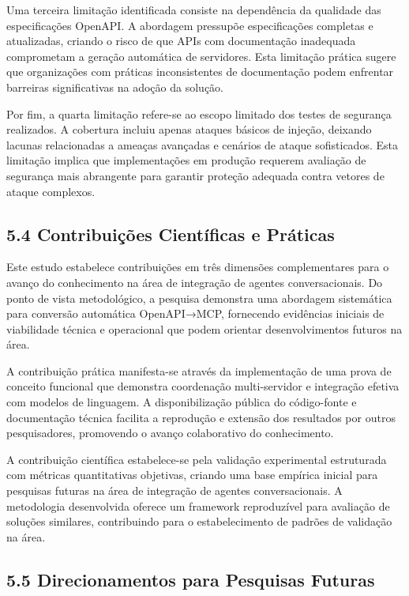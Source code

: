 \documentclass[
]{article}
\begin{document}
Uma terceira limitação identificada consiste na dependência da qualidade
das especificações OpenAPI. A abordagem pressupõe especificações
completas e atualizadas, criando o risco de que APIs com documentação
inadequada comprometam a geração automática de servidores. Esta
limitação prática sugere que organizações com práticas inconsistentes de
documentação podem enfrentar barreiras significativas na adoção da
solução.

Por fim, a quarta limitação refere-se ao escopo limitado dos testes de
segurança realizados. A cobertura incluiu apenas ataques básicos de
injeção, deixando lacunas relacionadas a ameaças avançadas e cenários de
ataque sofisticados. Esta limitação implica que implementações em
produção requerem avaliação de segurança mais abrangente para garantir
proteção adequada contra vetores de ataque complexos.

\subsection{5.4 Contribuições Científicas e
Práticas}\label{contribuiuxe7uxf5es-cientuxedficas-e-pruxe1ticas}

Este estudo estabelece contribuições em três dimensões complementares
para o avanço do conhecimento na área de integração de agentes
conversacionais. Do ponto de vista metodológico, a pesquisa demonstra
uma abordagem sistemática para conversão automática OpenAPI→MCP,
fornecendo evidências iniciais de viabilidade técnica e operacional que
podem orientar desenvolvimentos futuros na área.

A contribuição prática manifesta-se através da implementação de uma
prova de conceito funcional que demonstra coordenação multi-servidor e
integração efetiva com modelos de linguagem. A disponibilização pública
do código-fonte e documentação técnica facilita a reprodução e extensão
dos resultados por outros pesquisadores, promovendo o avanço
colaborativo do conhecimento.

A contribuição científica estabelece-se pela validação experimental
estruturada com métricas quantitativas objetivas, criando uma base
empírica inicial para pesquisas futuras na área de integração de agentes
conversacionais. A metodologia desenvolvida oferece um framework
reproduzível para avaliação de soluções similares, contribuindo para o
estabelecimento de padrões de validação na área.

\subsection{5.5 Direcionamentos para Pesquisas
Futuras}\label{direcionamentos-para-pesquisas-futuras}
\end{document}
